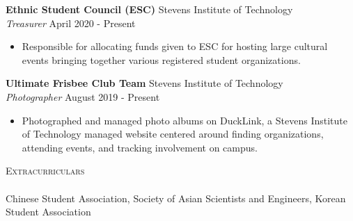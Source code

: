 \documentclass[10pt]{article}
\newcommand{\lineunder} {
    \vspace*{-8pt} \\
    \hspace*{-18pt} \hrulefill \\
}
\newcommand{\header} [1] {
    {\hspace*{-18pt}\vspace*{6pt} \textsc{#1}}
    \vspace*{-6pt} \lineunder
}
\begin{document}
\textbf{Ethnic Student Council (ESC)} \hfill Stevens Institute of Technology\\
\textit{Treasurer} \hfill April 2020 - Present\\
\vspace{-1mm}
\begin{itemize} \itemsep 1pt
	\item Responsible for allocating funds given to ESC for hosting large cultural events bringing together various registered student organizations.
\end{itemize}

\textbf{Ultimate Frisbee Club Team} \hfill Stevens Institute of Technology\\
\textit{Photographer} \hfill August 2019 - Present\\
\vspace{-1mm}
\begin{itemize} \itemsep 1pt
	\item Photographed and managed photo albums on DuckLink, a Stevens Institute of Technology managed website centered around finding organizations, attending events, and tracking involvement on campus.
\end{itemize}
\header{Extracurriculars}
Chinese Student Association, Society of Asian Scientists and Engineers, Korean Student Association
\end{document}
